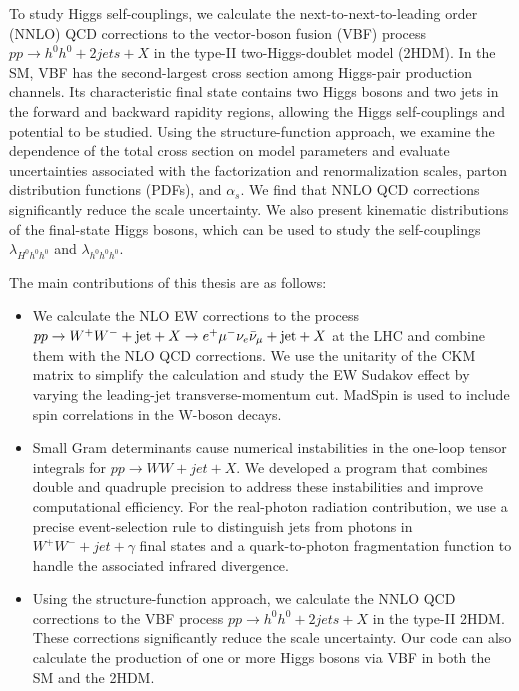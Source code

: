 \begin{enabstract}
To study Higgs self-couplings, we calculate the next-to-next-to-leading order (NNLO) QCD
corrections to the vector-boson fusion (VBF) process $pp\to h^0h^0+2jets+X$ in the type-II
two-Higgs-doublet model (2HDM). In the SM, VBF has the second-largest cross section among
Higgs-pair production channels. Its characteristic final state contains two Higgs bosons and
two jets in the forward and backward rapidity regions, allowing the Higgs self-couplings
and potential to be studied. Using the structure-function approach, we examine the dependence
of the total cross section on model parameters and evaluate uncertainties associated with the
factorization and renormalization scales, parton distribution functions (PDFs), and $\alpha_s$.
We find that NNLO QCD corrections significantly reduce the scale uncertainty. We also present
kinematic distributions of the final-state Higgs bosons, which can be used to study the
self-couplings $\lambda_{H^0h^0h^0}$ and $\lambda_{h^0h^0h^0}$.


The main contributions of this thesis are as follows:
\begin{itemize}
\item We calculate the NLO EW corrections to the process
$pp\to W^+W^-+{\rm jet}+X \to e^+ \mu^- \nu_e \bar \nu_{\mu}+{\rm jet}+X$
at the LHC and combine them with the NLO QCD corrections. We use the unitarity of the CKM matrix
to simplify the calculation and study the EW Sudakov effect by varying the leading-jet
transverse-momentum cut. MadSpin is used to include spin correlations in the W-boson decays.

\item Small Gram determinants cause numerical instabilities in the one-loop tensor integrals
for $pp\to WW+jet+X$. We developed a program that combines double and quadruple precision
to address these instabilities and improve computational efficiency. For the real-photon
radiation contribution, we use a precise event-selection rule to distinguish jets from
photons in $W^+W^-+jet+\gamma$ final states and a quark-to-photon fragmentation function
to handle the associated infrared divergence.

\item 
Using the structure-function approach, we calculate the NNLO QCD corrections to the VBF
process $pp\to h^0h^0+2jets+X$ in the type-II 2HDM. These corrections significantly reduce
the scale uncertainty. Our code can also calculate the production of one or more Higgs
bosons via VBF in both the SM and the 2HDM.
\end{itemize}


\end{enabstract}
